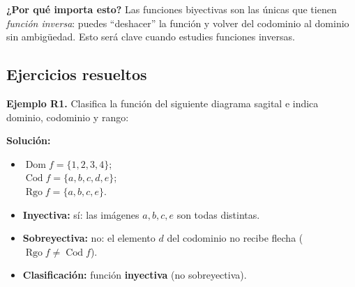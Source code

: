 \documentclass[12pt, letterpaper]{article}
\begin{document}
\begin{cuadroextra}
  \textbf{¿Por qué importa esto?} Las funciones biyectivas son las únicas que tienen \emph{función inversa}: puedes ``deshacer'' la función y volver del codominio al dominio sin ambigüedad. Esto será clave cuando estudies funciones inversas.
\end{cuadroextra}

\subsection{Ejercicios resueltos}

\textbf{Ejemplo R1.} Clasifica la función del siguiente diagrama sagital e indica dominio, codominio y rango:

\begin{center}
\end{center}

\begin{cuadrosolucion}
  \textbf{Solución:}
  \begin{itemize}
    \item $\operatorname{Dom} f = \{1, 2, 3, 4\}$;\\[2pt]
          $\operatorname{Cod} f = \{a, b, c, d, e\}$;\\[2pt]
          $\operatorname{Rgo} f = \{a, b, c, e\}$.
    \item \textbf{Inyectiva:} sí: las imágenes $a,b,c,e$ son todas distintas.
    \item \textbf{Sobreyectiva:} no: el elemento $d$ del codominio no recibe flecha ($\operatorname{Rgo} f \neq \operatorname{Cod} f$).
    \item \textbf{Clasificación:} función \textbf{inyectiva} (no sobreyectiva).
  \end{itemize}
\end{cuadrosolucion}
\end{document}
